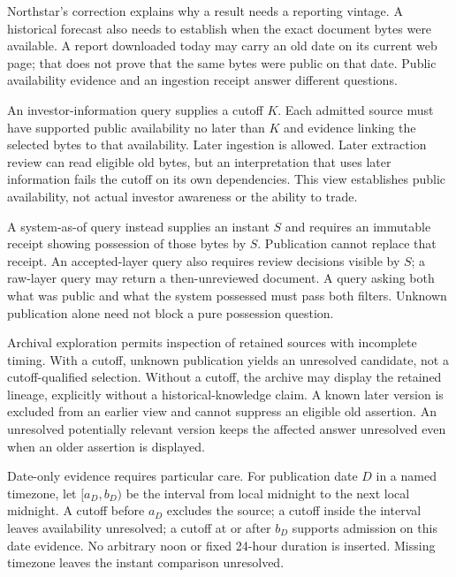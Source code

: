 Northstar's correction explains why a result needs a reporting vintage. A
historical forecast also needs to establish when the exact document bytes were
available. A report downloaded today may carry an old date on its current web
page; that does not prove that the same bytes were public on that date. Public
availability evidence and an ingestion receipt answer different questions.

An investor-information query supplies a cutoff $K$. Each admitted source must
have supported public availability no later than $K$ and evidence linking the
selected bytes to that availability. Later ingestion is allowed. Later
extraction review can read eligible old bytes, but an interpretation that uses
later information fails the cutoff on its own dependencies. This view establishes
public availability, not actual investor awareness or the ability to trade.

A system-as-of query instead supplies an instant $S$ and requires an immutable
receipt showing possession of those bytes by $S$. Publication cannot replace
that receipt. An accepted-layer query also requires review decisions visible
by $S$; a raw-layer query may return a then-unreviewed document. A query asking
both what was public and what the system possessed must pass both filters.
Unknown publication alone need not block a pure possession question.

Archival exploration permits inspection of retained sources with incomplete
timing. With a cutoff, unknown publication yields an unresolved candidate,
not a cutoff-qualified selection. Without a cutoff, the archive may display
the retained lineage, explicitly without a historical-knowledge claim. A known
later version is excluded from an earlier view and cannot suppress an eligible
old assertion. An unresolved potentially relevant version keeps the affected
answer unresolved even when an older assertion is displayed.

Date-only evidence requires particular care. For publication date $D$ in a
named timezone, let $[a_D,b_D)$ be the interval from local midnight to the next
local midnight. A cutoff before $a_D$ excludes the source; a cutoff inside the
interval leaves availability unresolved; a cutoff at or after $b_D$ supports
admission on this date evidence. No arbitrary noon or fixed 24-hour duration
is inserted. Missing timezone leaves the instant comparison unresolved.

